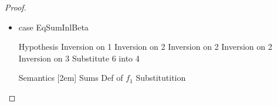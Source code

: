 \begin{proof}
\begin{itemize}
\item case EqSumInlBeta
  \begin{eqnproof}
              {Hypothesis}
              {Inversion on 1}
              {Inversion on 2}
              {Inversion on 2}
              {Inversion on 2}
              {Inversion on 3}
              {Substitute 6 into 4}
  \end{eqnproof}
  \begin{eqnproof}[\interpE{\judgeE{\Gamma}{\Case{\inl{e}}{x}{e_1}{y}{e_2}}{C}}\;\theta\;\gamma =]
          {Semantics}
           {}[2em]
          {Sums}
          {}
          {Def of $f_1$}
          {Substitutition}
  \end{eqnproof}


\end{itemize}
\end{proof}
